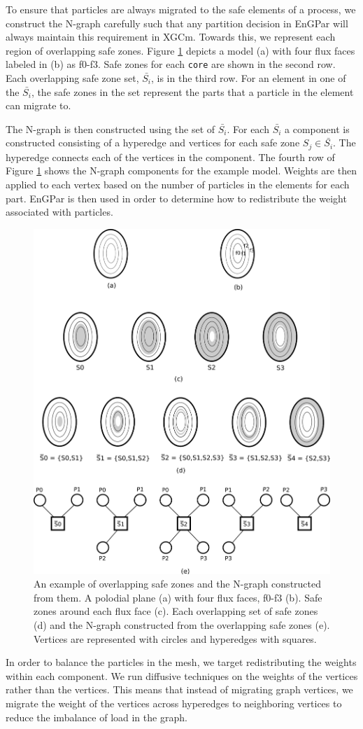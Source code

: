 \documentclass[conference]{IEEEtran}
\begin{document}
To ensure that particles are always migrated to the safe elements
of a process, we construct the N-graph carefully such that any partition
decision in EnGPar will always maintain this requirement in XGCm. Towards this,
we represent each region
of overlapping safe zones. Figure \ref{fig:sbars} depicts a model (a) with four flux faces labeled
in (b) as f0-f3. Safe zones for each \texttt{core} are shown in the second row.
Each overlapping safe zone set, $\bar{S_i}$, is in the third row. For an element in
one of the $\bar{S_i}$, the safe zones in the set represent the parts that a particle in
the element can migrate to.

The N-graph is then constructed using the set of $\bar{S_i}$. For each $\bar{S_i}$ a
component is constructed consisting of a hyperedge and vertices for each safe zone
$S_j \in \bar{S_i}$. The hyperedge connects each of the vertices in the component.
The fourth row of Figure \ref{fig:sbars} shows the N-graph components for the example model.
Weights are then applied to each vertex based on the number of particles in the elements
for each part. 
EnGPar is then used in order to determine how to redistribute the weight
associated with particles.

\begin{figure}[!ht]
  \centering
  \includegraphics[width=.4\textwidth]{../figures/xgcm_ngraph_construction.png}
  \caption{An example of overlapping safe zones and the N-graph constructed from
  them. A polodial plane (a) with four flux faces, f0-f3 (b). Safe zones around
  each flux face (c). Each overlapping set of safe zones (d) and the N-graph
  constructed from the overlapping safe zones (e). Vertices are represented with
  circles and hyperedges with squares.}
  \label{fig:sbars}
\end{figure}

In order to balance the particles in the mesh, we target redistributing the weights within
each component. We run diffusive techniques on the weights of the vertices
rather than the vertices. This means that instead of migrating graph vertices, we migrate the
weight of the vertices across hyperedges to neighboring vertices to reduce the imbalance
of load in the graph.
\end{document}
